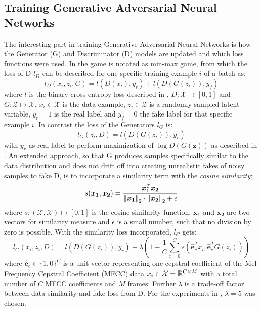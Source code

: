 \subsection{Training Generative Adversarial Neural Networks}
The interesting part in training Generative Adversarial Neural Networks is how the Generator (G) and Discriminator (D) models are updated and which loss functions were used.
In  the game is notated as min-max game, from which the loss of D $l_D$ can be described for one specific training example $i$ of a batch as:
\begin{equation}
  l_D(x_i, z_i, G) = l(D(x_i), y_r) + l(D(G(z_i)), y_f)
\end{equation}
where $l$ is the binary cross-entropy loss described in , $D: \mathcal{X} \mapsto [0, 1]$ and $G: \mathcal{Z} \mapsto \mathcal{X}$, $x_i \in \mathcal{X}$ is the data example, $z_i \in \mathcal{Z}$ is a randomly sampled latent variable, $y_r = 1$ is the real label and $y_f = 0$ the fake label for that specific example $i$.
In contrast the loss of the Generators $l_G$ is:
\begin{equation}
  l_G(z_i, D) =  l(D(G(z_i)), y_r)
\end{equation}
with $y_r$ as real label to perform maximization of $\log D(G(\bm{z}))$ as described in .
An extended approach, so that G produces samples specifically similar to the data distribution and does not drift off into creating unrealistic fakes of noisy samples to fake D, is to incorporate a similarity term with the \emph{cosine similarity}:
\begin{equation}
  s(\bm{x_1}, \bm{x_2}) = \frac{\bm{x_1}^T \bm{x_2}}{\norm{\bm{x_1}}_2 \cdot \norm{\bm{x_2}}_2 + \epsilon} 
\end{equation}
where $s : (\mathcal{X}, \mathcal{X}) \mapsto [0, 1]$ is the cosine similarity function, $\bm{x_1}$ and $\bm{x_2}$ are two vectors for similarity measure and $\epsilon$ is a small number, such that no division by zero is possible.
With the similarity loss incorporated, $l_G$ gets:
\begin{equation}
  l_G(x_i, z_i, D) =  l(D(G(z_i)), y_r) + \lambda \left(1 - \frac{1}{C} \sum_{c=0}^{C} s(\hat{\bm{e}}_c^T x_i , \hat{\bm{e}}_c^T G(z_i)) \right)
\end{equation}
where $\hat{\bm{e}}_c \in \{1, 0\}^C$ is a unit vector representing one cepstral coefficient of the Mel Frequency Cepstral Coefficient (MFCC) data $x_i \in \mathcal{X} = \mathbb{R}^{C \times M}$ with a total number of $C$ MFCC coefficients and $M$ frames.
Further $\lambda$ is a trade-off factor between data similarity and fake loss from D.
For the experiments in , $\lambda = 5$ was chosen.

